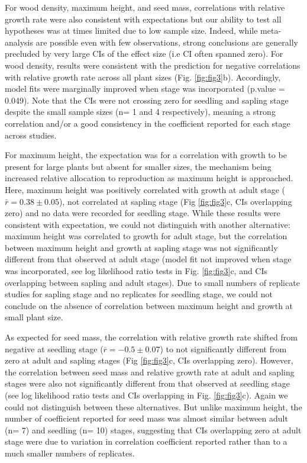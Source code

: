 \documentclass[a4paper,11pt]{article}
\begin{document}
For wood density, maximum height, and seed mass, correlations with relative growth rate were also consistent with expectations but our ability to test all hypotheses was at times limited due to low sample size. Indeed, while meta-analysis are possible even with few observations, strong conclusions are generally precluded by very large CIs of the effect size (i.e CI often spanned zero).
For wood density, results were consistent with the prediction for negative correlations with relative growth rate across all plant sizes (Fig. \ref{fig:fig3}b). Accordingly, model fits were marginally improved when stage was incorporated (p.value = 0.049). Note that the CIs were not crossing zero for seedling and sapling stage despite the small sample sizes (n= 1 and 4 respectively), meaning a strong correlation and/or a good consistency in the coefficient reported for each stage across studies.

For maximum height, the expectation was for a correlation with growth to be present for large plants but absent for smaller sizes, the mechanism being increased relative allocation to reproduction as maximum height is approached. Here, maximum height was positively correlated with growth at adult stage ($\bar{r}= 0.38 \pm 0.05$), not correlated at sapling stage (Fig \ref{fig:fig3}c, CIs overlapping zero) and no data were recorded for seedling stage.
While these results were consistent with expectation, we could not distinguish with another alternative: maximum height was correlated to growth for adult stage, but the correlation between maximum height and growth at sapling stage was not significantly different from that observed at adult stage (model fit not improved when stage was incorporated, see log likelihood ratio tests in Fig. \ref{fig:fig3}c, and CIs overlapping between sapling and adult stages). Due to small numbers of replicate studies for sapling stage and no replicates for seedling stage, we could not conclude on the absence of correlation between maximum height and growth at small plant size.

As expected for seed mass, the correlation with relative growth rate shifted from negative at seedling stage ($\bar{r}= -0.5 \pm 0.07$) to not significantly different from zero at adult and sapling stages (Fig \ref{fig:fig3}c, CIs overlapping zero). However, the correlation between seed mass and relative growth rate at adult and sapling stages were also not significantly different from that observed at seedling stage (see log likelihood ratio tests and CIs overlapping in Fig. \ref{fig:fig3}c). Again we could not distinguish between these alternatives. But unlike maximum height, the number of coefficient reported for seed mass was almost similar between adult (n= 7) and seedling (n= 10) stages, suggesting that CIs overlapping zero at adult stage were due to variation in correlation coefficient reported rather than to a much smaller numbers of replicates.
\end{document}
